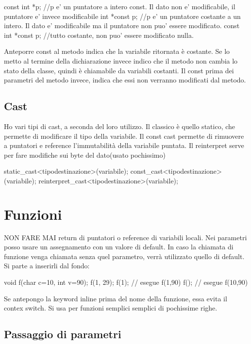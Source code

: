 \begin{cpp}
const int *p;		//p e' un puntatore a intero const. Il dato non e' modificabile, il puntatore e' invece modificabile
int *const p;		//p e' un puntatore costante a un intero. Il dato e' modificabile ma il puntatore non puo' essere modificato.
const int *const p;		//tutto costante, non puo' essere modificato nulla.
\end{cpp}

Anteporre const al metodo indica che la variabile ritornata è costante. Se lo metto al termine della dichiarazione invece indico che il metodo non cambia lo stato della classe, quindi è chiamabile da variabili costanti.
Il const prima dei parametri del metodo invece, indica che essi non verranno modificati dal metodo.

\section{Cast}
Ho vari tipi di cast, a seconda del loro utilizzo. Il classico è quello statico, che permette di modificare il tipo della variabile. Il const cast permette di rimuovere a puntatori e reference l'immutabilità della variabile puntata. Il reinterpret serve per fare modifiche sui byte del dato(usato pochissimo)

\begin{cpp}
static_cast<tipodestinazione>(variabile);
const_cast<tipodestinazione>(variabile);
reinterpret_cast<tipodestinazione>(variabile);
\end{cpp}

\chapter{Funzioni}
NON FARE MAI return di puntatori o reference di variabili locali. Nei parametri posso usare un assegnamento con un valore di default. In caso la chiamata di funzione venga chiamata senza quel parametro, verrà utilizzato quello di default. Si parte a inserirli dal fondo:

\begin{cpp}
void f(char c=10, int v=90);
f(1, 29);
f(1); // esegue f(1,90)
f(); // esegue f(10,90)
\end{cpp}

Se antepongo la keyword inline prima del nome della funzione, essa evita il contex switch. Si usa per funzioni semplici semplici di pochissime righe.

\section{Passaggio di parametri}

